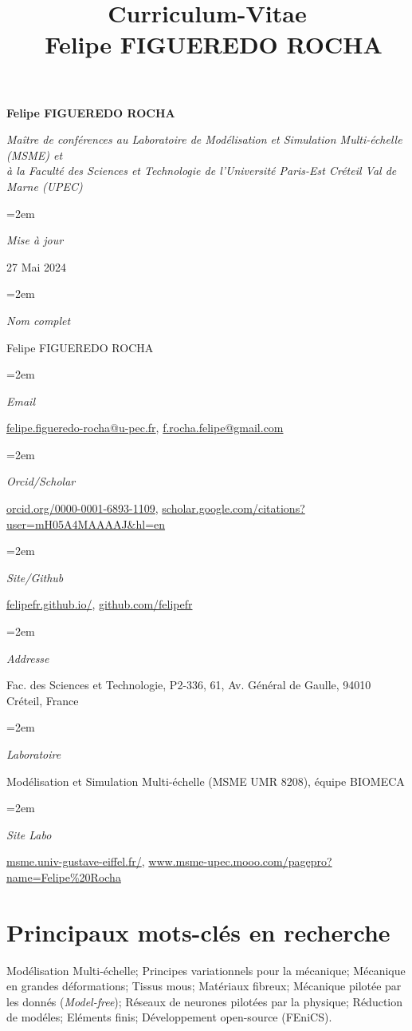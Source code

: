 \documentclass[french]{article}
\title{\Large {\bf Curriculum-Vitae} \\ Felipe FIGUEREDO ROCHA}
\date{}
\newcommand{\name}[1]{
	\huge %
	\begin{center} \textbf{#1} \end{center}\par
	\normalsize\normalfont}
\newcommand{\motto}[1]{
	\large %
	\begin{center} \textsl{#1}\end{center}\par
	\normalsize \normalfont}
\newcommand{\info}[2]{
	\noindent\hangindent=2em\hangafter=0
	\parbox{60pt}{\textsl{#1}} %
		#2 \par
} %
\begin{document}

\name{Felipe FIGUEREDO ROCHA}
\vspace*{-10pt}
\motto{Maître de conférences au Laboratoire de Modélisation et Simulation Multi-échelle (MSME) et \\ à la Faculté des Sciences et Technologie de l'Université Paris-Est Créteil Val de Marne (UPEC)}

\info{Mise à jour}{27 Mai 2024}
\info{Nom complet}{Felipe FIGUEREDO ROCHA}
\info{Email}{\url{felipe.figueredo-rocha@u-pec.fr}, \url{f.rocha.felipe@gmail.com}}
\info{Orcid/Scholar}{\url{orcid.org/0000-0001-6893-1109}, \url{scholar.google.com/citations?user=mH05A4MAAAAJ&hl=en}
\info{Site/Github}{\url{felipefr.github.io/}, \url{github.com/felipefr}}
\info{Addresse}{Fac. des Sciences et Technologie, P2-336, 61, Av. Général de Gaulle, 94010 Créteil, France}
\info{Laboratoire}{Modélisation et Simulation Multi-échelle (MSME UMR 8208), équipe BIOMECA}
\info{Site Labo}{\url{msme.univ-gustave-eiffel.fr/}, \url{www.msme-upec.mooo.com/pagepro?name=Felipe\%20Rocha}}
}


\section*{Principaux mots-clés en recherche}
%
Modélisation Multi-échelle; Principes variationnels pour la mécanique; Mécanique en grandes déformations; Tissus mous;  Matériaux fibreux; Mécanique pilotée par les donnés (\textit{Model-free}); Réseaux de neurones pilotées par la physique; Réduction de modéles; Eléments finis; Développement open-source (FEniCS).
\end{document}
